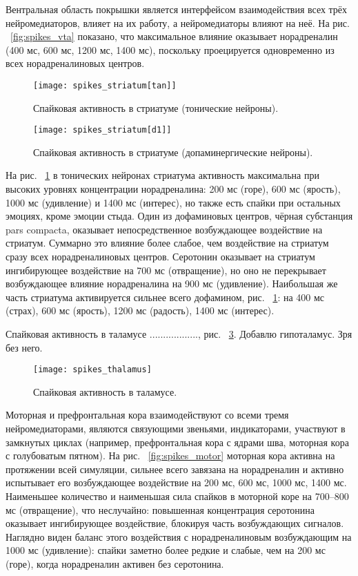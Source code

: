 Вентральная область покрышки является интерфейсом взаимодействия всех трёх нейромедиаторов, влияет на их работу, а нейромедиаторы влияют на неё. На рис. ~\ref{fig:spikes_vta} показано, что максимальное влияние оказывает норадреналин (400 мс, 600 мс, 1200 мс, 1400 мс), поскольку проецируется одновременно из всех норадреналиновых центров.

\begin{figure}
	\centering
	\texttt{[image: spikes\_striatum[tan]]}
	\caption{Спайковая активность в стриатуме (тонические нейроны).}
	\label{fig:spikes_striatum}
\end{figure}

\begin{figure}
	\centering
	\texttt{[image: spikes\_striatum[d1]]}
	\caption{Спайковая активность в стриатуме (допаминергические нейроны).}
	\label{fig:spikes_striatumх[d1]}
\end{figure}


На рис. ~\ref{fig:spikes_striatum} в тонических нейронах стриатума активность максимальна при высоких уровнях концентрации норадреналина: 200 мс (горе), 600 мс (ярость), 1000 мс (удивление) и 1400 мс (интерес), но также есть спайки при остальных эмоциях, кроме эмоции стыда. Один из дофаминовых центров, чёрная субстанция pars compacta, оказывает непосредственное возбуждающее воздействие на стриатум. Суммарно это влияние более слабое, чем воздействие на стриатум сразу всех норадреналиновых центров. Серотонин оказывает на стриатум ингибирующее воздействие на 700 мс (отвращение), но оно не перекрывает возбуждающее влияние норадреналина на 900 мс (удивление). Наибольшая же часть стриатума активируется сильнее всего дофамином, рис. ~\ref{fig:spikes_striatum}: на 400 мс (страх), 600 мс (ярость), 1200 мс (радость), 1400 мс (интерес).


Спайковая активность в таламусе .................., рис. ~\ref{fig:spikes_thalamus}.
Добавлю гипоталамус. Зря без него.

\begin{figure}
	\centering
	\texttt{[image: spikes\_thalamus]}
	\caption{Спайковая активность в таламусе.}
	\label{fig:spikes_thalamus}
\end{figure}

Моторная и префронтальная кора взаимодействуют со всеми тремя нейромедиаторами, являются связующими звеньями, индикаторами, участвуют в замкнутых циклах (например, префронтальная кора с ядрами шва, моторная кора с голубоватым пятном). На рис. ~\ref{fig:spikes_motor} моторная кора активна на протяжении всей симуляции, сильнее всего завязана на норадреналин и активно испытывает его возбуждающее воздействие на 200 мс, 600 мс, 1000 мс, 1400 мс. Наименьшее количество и наименьшая сила спайков в моторной коре на 700--800 мс (отвращение), что неслучайно: повышенная концентрация серотонина оказывает ингибирующее воздействие, блокируя часть возбуждающих сигналов. Наглядно виден баланс этого воздействия с норадреналиновым возбуждающим на 1000 мс (удивление): спайки заметно более редкие и слабые, чем на 200 мс (горе), когда норадреналин активен без серотонина.


